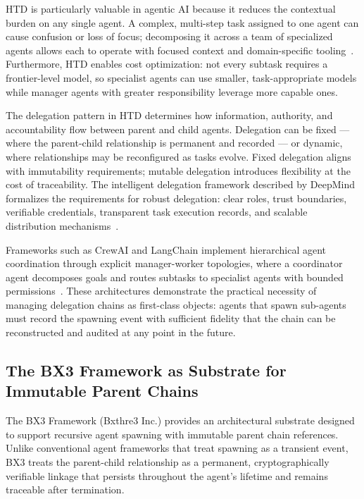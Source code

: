 HTD is particularly valuable in agentic AI because it reduces the contextual burden on any single agent. A complex, multi-step task assigned to one agent can cause confusion or loss of focus; decomposing it across a team of specialized agents allows each to operate with focused context and domain-specific tooling~\cite{ibm_hierarchical_agents_2026}. Furthermore, HTD enables cost optimization: not every subtask requires a frontier-level model, so specialist agents can use smaller, task-appropriate models while manager agents with greater responsibility leverage more capable ones.

The delegation pattern in HTD determines how information, authority, and accountability flow between parent and child agents. Delegation can be fixed — where the parent-child relationship is permanent and recorded — or dynamic, where relationships may be reconfigured as tasks evolve. Fixed delegation aligns with immutability requirements; mutable delegation introduces flexibility at the cost of traceability. The intelligent delegation framework described by DeepMind formalizes the requirements for robust delegation: clear roles, trust boundaries, verifiable credentials, transparent task execution records, and scalable distribution mechanisms~\cite{deepmind_delegation_2026}.

Frameworks such as CrewAI and LangChain implement hierarchical agent coordination through explicit manager-worker topologies, where a coordinator agent decomposes goals and routes subtasks to specialist agents with bounded permissions~\cite{crewai_hierarchical_2024}. These architectures demonstrate the practical necessity of managing delegation chains as first-class objects: agents that spawn sub-agents must record the spawning event with sufficient fidelity that the chain can be reconstructed and audited at any point in the future.

\subsection{The BX3 Framework as Substrate for Immutable Parent Chains}

The BX3 Framework (Bxthre3 Inc.) provides an architectural substrate designed to support recursive agent spawning with immutable parent chain references. Unlike conventional agent frameworks that treat spawning as a transient event, BX3 treats the parent-child relationship as a permanent, cryptographically verifiable linkage that persists throughout the agent's lifetime and remains traceable after termination.

